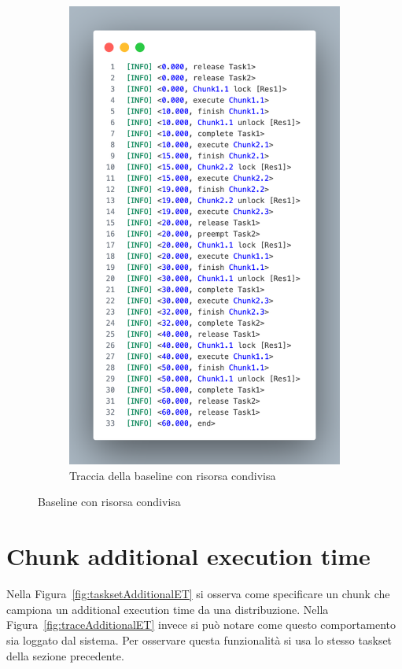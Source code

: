 \begin{figure}[htbp]
\begin{subfigure}{0.45\textwidth}
        \includegraphics[width=.9\textwidth]{immagini/trace baseline con risorse.pdf}
        \caption{Traccia della baseline con risorsa condivisa}
        \label{fig:baselineTraceWRes}
        \vfill
    \end{subfigure}
    \caption{Baseline con risorsa condivisa}
\end{figure}

\section{Chunk additional execution time}
Nella Figura~\ref{fig:tasksetAdditionalET} si osserva come specificare un chunk che campiona un additional execution time da una distribuzione. Nella Figura~\ref{fig:traceAdditionalET} invece si può notare come questo comportamento sia loggato dal sistema. Per osservare questa funzionalità si usa lo stesso taskset della sezione precedente.

